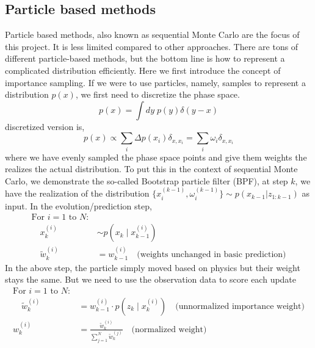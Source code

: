 \documentclass{article}
\begin{document}
\subsection{Particle based methods}
Particle based methods, also known as sequential Monte Carlo are the focus of this project. It is less limited compared to other approaches. There are tons of different particle-based methods, but the bottom line is how to represent a complicated distribution efficiently. Here we first introduce the concept of importance sampling. If we were to use particles, namely, samples to represent a distribution $p(x)$, we first need to discretize the phase space. 
\begin{equation}
    p(x)=\int dy\; p(y) \delta(y-x)
\end{equation} 
discretized version is,
\begin{equation}
    p(x)\propto \sum_i \Delta p(x_i) \delta_{x,x_i}= \sum_i \omega_i \delta_{x,x_i}
\end{equation}
where we have evenly sampled the phase space points and give them weights the realizes the actual distribution. 
To put this in the context of sequential Monte Carlo, we demonstrate the so-called Bootstrap particle filter (BPF), at step $k$, we have the realization of the distribution $\{x^{(k-1)}_i,\omega^{(k-1)}_i\} \sim p(x_{k-1}|z_{1:k-1})$ as input. In the evolution/prediction step,
\begin{equation}
\begin{split}
\text{For } i = 1 \text{ to } N:& \\
\quad x_k^{(i)} &\sim p(x_k \mid x_{k-1}^{(i)}) \\
\quad \tilde{w}_k^{(i)} &= w_{k-1}^{(i)} \quad \text{(weights unchanged in basic prediction)}
\end{split}
\end{equation}
In the above step, the particle simply moved based on physics but their weight stays the same. But we need to use the observation data to score each update
\begin{equation}
\begin{split}
\text{For } i = 1 \text{ to } N:& \\
\quad \tilde{w}_k^{(i)} &= w_{k-1}^{(i)} \cdot p(z_k \mid x_k^{(i)}) \quad \text{(unnormalized importance weight)} \\
w_k^{(i)} &= \frac{\tilde{w}_k^{(i)}}{\sum_{j=1}^N \tilde{w}_k^{(j)}} \quad \text{(normalized weight)}
\end{split}
\end{equation}
\end{document}
